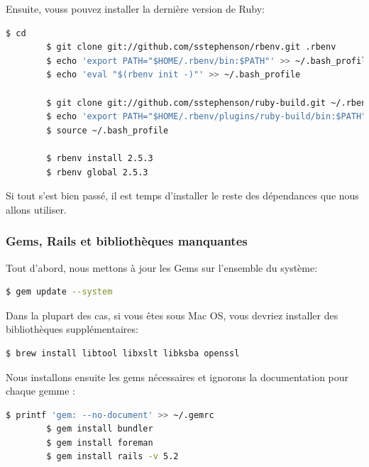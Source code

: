 \documentclass[]{report}
\begin{document}
        Ensuite, vouss pouvez installer la dernière version de Ruby:

        \begin{scriptsize}
        \begin{lstlisting}[language=bash]
        $ cd
        $ git clone git://github.com/sstephenson/rbenv.git .rbenv
        $ echo 'export PATH="$HOME/.rbenv/bin:$PATH"' >> ~/.bash_profile
        $ echo 'eval "$(rbenv init -)"' >> ~/.bash_profile

        $ git clone git://github.com/sstephenson/ruby-build.git ~/.rbenv/plugins/ruby-build
        $ echo 'export PATH="$HOME/.rbenv/plugins/ruby-build/bin:$PATH"' >> ~/.bash_profile
        $ source ~/.bash_profile

        $ rbenv install 2.5.3
        $ rbenv global 2.5.3
        \end{lstlisting}
        \end{scriptsize}

        Si tout s'est bien passé, il est temps d'installer le reste des dépendances que nous allons utiliser.

      \subsubsection{Gems, Rails et bibliothèques manquantes}

        Tout d'abord, nous mettons à jour les Gems sur l'ensemble du système:

        \begin{scriptsize}
        \begin{lstlisting}[language=bash]
        $ gem update --system
        \end{lstlisting}
        \end{scriptsize}

        Dans la plupart des cas, si vous êtes sous Mac OS, vous devriez installer des bibliothèques supplémentaires:

        \begin{scriptsize}
        \begin{lstlisting}[language=bash]
        $ brew install libtool libxslt libksba openssl
        \end{lstlisting}
        \end{scriptsize}

        Nous installons ensuite les gems nécessaires et ignorons la documentation pour chaque gemme :

        \begin{scriptsize}
        \begin{lstlisting}[language=bash]
        $ printf 'gem: --no-document' >> ~/.gemrc
        $ gem install bundler
        $ gem install foreman
        $ gem install rails -v 5.2
        \end{lstlisting}
        \end{scriptsize}
\end{document}
